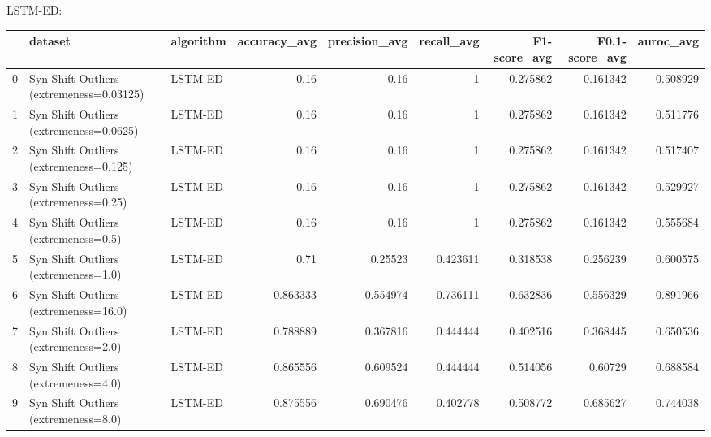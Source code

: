 LSTM-ED:

\begin{tabular}{rllrrrrrr}
\hline
    & dataset                                  & algorithm   &   accuracy\_avg &   precision\_avg &   recall\_avg &   F1-score\_avg &   F0.1-score\_avg &   auroc\_avg \\
\hline
  0 & Syn Shift Outliers (extremeness=0.03125) & LSTM-ED     &       0.16     &        0.16     &     1        &       0.275862 &         0.161342 &    0.508929 \\
  1 & Syn Shift Outliers (extremeness=0.0625)  & LSTM-ED     &       0.16     &        0.16     &     1        &       0.275862 &         0.161342 &    0.511776 \\
  2 & Syn Shift Outliers (extremeness=0.125)   & LSTM-ED     &       0.16     &        0.16     &     1        &       0.275862 &         0.161342 &    0.517407 \\
  3 & Syn Shift Outliers (extremeness=0.25)    & LSTM-ED     &       0.16     &        0.16     &     1        &       0.275862 &         0.161342 &    0.529927 \\
  4 & Syn Shift Outliers (extremeness=0.5)     & LSTM-ED     &       0.16     &        0.16     &     1        &       0.275862 &         0.161342 &    0.555684 \\
  5 & Syn Shift Outliers (extremeness=1.0)     & LSTM-ED     &       0.71     &        0.25523  &     0.423611 &       0.318538 &         0.256239 &    0.600575 \\
  6 & Syn Shift Outliers (extremeness=16.0)    & LSTM-ED     &       0.863333 &        0.554974 &     0.736111 &       0.632836 &         0.556329 &    0.891966 \\
  7 & Syn Shift Outliers (extremeness=2.0)     & LSTM-ED     &       0.788889 &        0.367816 &     0.444444 &       0.402516 &         0.368445 &    0.650536 \\
  8 & Syn Shift Outliers (extremeness=4.0)     & LSTM-ED     &       0.865556 &        0.609524 &     0.444444 &       0.514056 &         0.60729  &    0.688584 \\
  9 & Syn Shift Outliers (extremeness=8.0)     & LSTM-ED     &       0.875556 &        0.690476 &     0.402778 &       0.508772 &         0.685627 &    0.744038 \\
\hline
\end{tabular}

